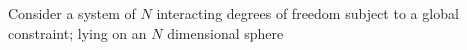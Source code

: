 Consider a system of $N$ interacting degrees of freedom subject to a global constraint; lying on an $N$ dimensional sphere 